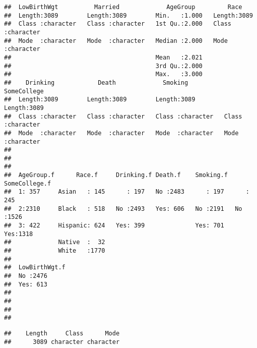 \documentclass[
]{article}
\newenvironment{Shaded}{\begin{snugshade}}{\end{snugshade}}
\newcommand{\FunctionTok}[1]{\textcolor[rgb]{0.00,0.00,0.00}{#1}}
\newcommand{\NormalTok}[1]{#1}
\newcommand{\SpecialCharTok}[1]{\textcolor[rgb]{0.00,0.00,0.00}{#1}}
\begin{document}
\begin{verbatim}
##  LowBirthWgt          Married             AgeGroup         Race          
##  Length:3089        Length:3089        Min.   :1.000   Length:3089       
##  Class :character   Class :character   1st Qu.:2.000   Class :character  
##  Mode  :character   Mode  :character   Median :2.000   Mode  :character  
##                                        Mean   :2.021                     
##                                        3rd Qu.:2.000                     
##                                        Max.   :3.000                     
##    Drinking            Death             Smoking          SomeCollege       
##  Length:3089        Length:3089        Length:3089        Length:3089       
##  Class :character   Class :character   Class :character   Class :character  
##  Mode  :character   Mode  :character   Mode  :character   Mode  :character  
##                                                                             
##                                                                             
##                                                                             
##  AgeGroup.f      Race.f     Drinking.f Death.f    Smoking.f  SomeCollege.f
##  1: 357     Asian   : 145      : 197   No :2483      : 197      : 245     
##  2:2310     Black   : 518   No :2493   Yes: 606   No :2191   No :1526     
##  3: 422     Hispanic: 624   Yes: 399              Yes: 701   Yes:1318     
##             Native  :  32                                                 
##             White   :1770                                                 
##                                                                           
##  LowBirthWgt.f
##  No :2476     
##  Yes: 613     
##               
##               
##               
## 
\end{verbatim}

\begin{Shaded}
\end{Shaded}

\begin{verbatim}
##    Length     Class      Mode 
##      3089 character character
\end{verbatim}

\begin{Shaded}
\end{Shaded}
\end{document}
